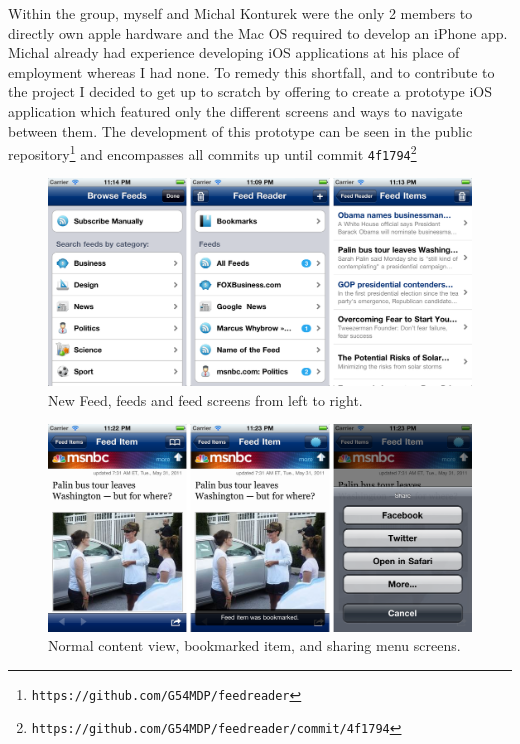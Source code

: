 \documentclass[a4paper,11pt]{article}
\begin{document}
	Within the group, myself and Michal Konturek were the only 2 members to
	directly own apple hardware and the Mac OS required to develop an iPhone
	app. Michal already had experience developing iOS applications at his
	place of employment whereas I had none. To remedy this shortfall, and to
	contribute to the project I decided to get up to scratch by offering to
	create a prototype iOS application which featured only the different
	screens and ways to navigate between them. The development of this
	prototype can be seen in the public
	repository\footnote{\texttt{https://github.com/G54MDP/feedreader}} and
	encompasses all commits up until commit
	\verb!4f1794!\footnote{
	\texttt{https://github.com/G54MDP/feedreader/commit/4f1794}}
	
	\begin{figure}[t]
		\centering
		\includegraphics[width=12.65cm]{images/screens1.png}
		\caption{New Feed, feeds and feed screens from left to right.}
		\label{screens1}
	\end{figure}
	
	\begin{figure}[t]
		\centering
		\includegraphics[width=12.65cm]{images/screens2.png}
		\caption{Normal content view, bookmarked item, and sharing menu
		    screens.}
		\label{screens2}
	\end{figure}
	
\end{document}
